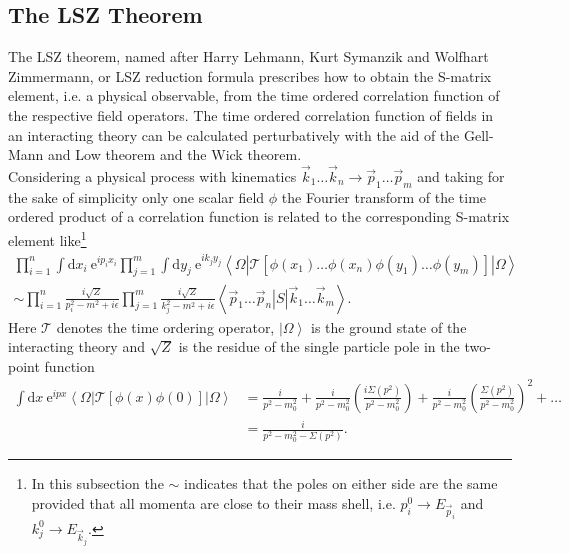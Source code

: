 \subsection{The LSZ Theorem}\label{sec:LSZ}
The LSZ theorem\cite{Lehmann:1954rq}, named after  Harry Lehmann, Kurt Symanzik and Wolfhart Zimmermann, or LSZ reduction formula prescribes how to obtain the S-matrix element, i.e. a physical observable, from the time ordered correlation function of the respective field operators. The time ordered correlation function of fields in an interacting theory can be calculated perturbatively with the aid of the Gell-Mann and Low theorem and the Wick theorem. \\
Considering a physical process with kinematics $\vec{k}_1 \hdots \vec{k}_n \to \vec{p}_1 \hdots \vec{p}_m$ and taking for the sake of simplicity only one scalar field $\phi$ the Fourier transform of the time ordered product of a correlation function is related to the corresponding S-matrix element like\footnote{In this subsection the $\sim$ indicates that the poles on either side are the same provided that all momenta are close to their mass shell, i.e. $p_i^0 \to E_{\vec{p}_i}$ and $k_j^0 \to E_{\vec{k}_j}$.}
\begin{align}
\prod_{i=1}^n \int \mathrm{d}x_i\ \mathrm{e}^{ip_i x_i} \prod_{j=1}^m \int \mathrm{d}y_j\ \mathrm{e}^{ik_j y_j} \left\langle \Omega | \mathcal{T} \left[ \phi(x_1) \hdots \phi(x_n) \phi(y_1) \hdots \phi(y_m) \right] | \Omega\right\rangle \nonumber\\
\sim \prod_{i=1}^n \frac{i\sqrt{Z}}{p_i^2 - m^2 + i\epsilon} \prod_{j=1}^m \frac{i\sqrt{Z}}{k_j^2 - m^2 + i\epsilon} \left\langle \left.\left.\vec{p}_1 \hdots \vec{p}_n \right| S \right| \vec{k}_1 \hdots \vec{k}_m \right\rangle .\label{eq:LSZ}
\end{align}
Here $\mathcal{T}$ denotes the time ordering operator, $\left.| \Omega \right\rangle$ is the ground state of the interacting theory and $\sqrt{Z}$ is the residue of the single particle pole in the two-point function 
\begin{align}
\int \mathrm{d}x\ \mathrm{e}^{ip x} \left\langle \Omega | \mathcal{T} \left[ \phi(x) \phi(0) \right] | \Omega\right\rangle &= \frac{i}{p^2-m_0^2} + \frac{i}{p^2-m_0^2} \left(\frac{i\Sigma(p^2)}{p^2-m_0^2}\right) + \frac{i}{p^2-m_0^2} \left(\frac{\Sigma(p^2)}{p^2-m_0^2}\right)^2 + \hdots\nonumber\\
&= \frac{i}{p^2 - m_0^2 - \Sigma(p^2)}.\label{eq:propagator}
\end{align}
